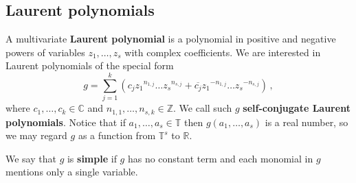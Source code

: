 \subsection{Laurent polynomials}

A multivariate \textbf{Laurent polynomial} is a polynomial in positive
and negative powers of variables $z_1,\ldots,z_s$ with complex
coefficients.  We are interested in Laurent polynomials of the special form
\[ g = \sum_{j=1}^k \left( c_j {z_1}^{n_{1,j}}\ldots {z_s}^{n_{s,j}} +
    \overline{c_j} {z_1}^{-n_{1,j}}\ldots {z_s}^{-n_{s,j}} \right) \,
  ,\] where $c_1,\ldots,c_k \in \mathbb{C}$ and
$n_{1,1},\ldots,n_{s,k} \in \mathbb{Z}$.  We call such $g$
\textbf{self-conjugate Laurent polynomials}.  Notice that if
$a_1,\ldots,a_s \in \mathbb{T}$ then $g(a_1,\ldots,a_s)$ is a real
number, so we may regard $g$ as a function from $\mathbb{T}^s$ to
$\mathbb{R}$.

We say that $g$ is \textbf{simple} if $g$ has no constant term and
each monomial in $g$ mentions only a single variable.

